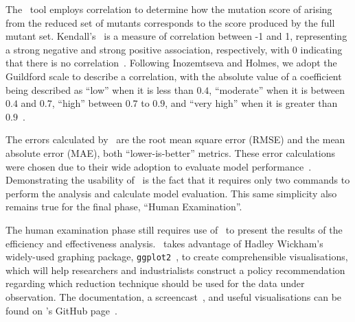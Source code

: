 
The \mr~tool employs correlation to determine how the mutation score of arising from the reduced set of mutants
corresponds to the score produced by the full mutant set. Kendall's \taub~is a measure of correlation between -1 and 1,
representing a strong negative and strong positive association, respectively, with 0 indicating that there is no
correlation~\cite{mcleod2015kendall}. Following Inozemtseva and Holmes, we adopt the Guildford scale to describe a
correlation, with the absolute value of a coefficient being described as ``low'' when it is less than $0.4$,
``moderate'' when it is between $0.4$ and $0.7$, ``high'' between $0.7$ to $0.9$, and ``very high'' when it is
greater than $0.9$~\cite{inozemtseva2014coverage}.



The errors calculated by
\mr~are the root mean square error (RMSE) and the mean absolute error (MAE), both ``lower-is-better'' metrics.
These error calculations were chosen due to their wide adoption to evaluate model performance~\cite{chai2014root}.
Demonstrating the usability of \mr~is the fact that it requires only two commands to perform the analysis and
calculate model evaluation. This same simplicity also remains true for the final phase, ``Human Examination''.

The human examination phase still requires use of \mr~to present the results of the efficiency and
effectiveness analysis. \mr~takes advantage of Hadley Wickham's widely-used graphing package,
\texttt{ggplot2}~\cite{ggplot2}, to create comprehensible visualisations, which will help researchers and
industrialists construct a policy recommendation regarding which reduction technique should be used for the
data under observation. The documentation, a screencast~\cite{asciinema}, and useful visualisations can be
found on \mr's GitHub page~\cite{tool}.


